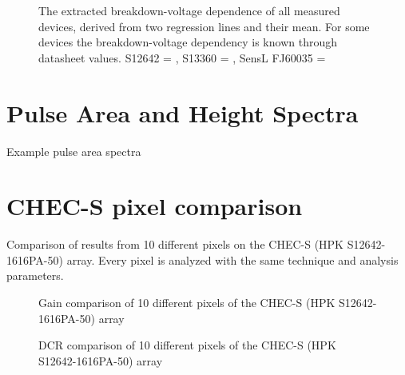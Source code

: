 \documentclass[12pt,article,type=msc,colorback,accentcolor=tud9c]{tudthesis}
\begin{document}
{\begin{figure}[h]
\begin{centering}
\caption{The extracted breakdown-voltage dependence of all measured devices, derived from two regression lines and their mean. For some devices the breakdown-voltage dependency is known through datasheet values. S12642 = , S13360 = , SensL FJ60035 = }
\label{app:Device_Vbr_Table}
\end{centering}
\end{figure}







\clearpage
\section{Pulse Area and Height Spectra}
\label{app:PAS_Clean}
Example pulse area spectra



\clearpage
\section{CHEC-S pixel comparison}
Comparison of results from 10 different pixels on the CHEC-S (HPK S12642-1616PA-50) array. Every pixel is analyzed with the same technique and analysis parameters.

\begin{figure}[h]
\begin{centering}
\caption{Gain comparison of 10 different pixels of the CHEC-S (HPK S12642-1616PA-50) array}
\label{app:CHEC_S_multipixel_Gain}
\end{centering}
\end{figure}

\begin{figure}[h]
\begin{centering}
\caption{DCR comparison of 10 different pixels of the CHEC-S (HPK S12642-1616PA-50) array}
\label{app:CHEC_S_multipixel_DCR}
\end{centering}
\end{figure}

}
\end{document}
